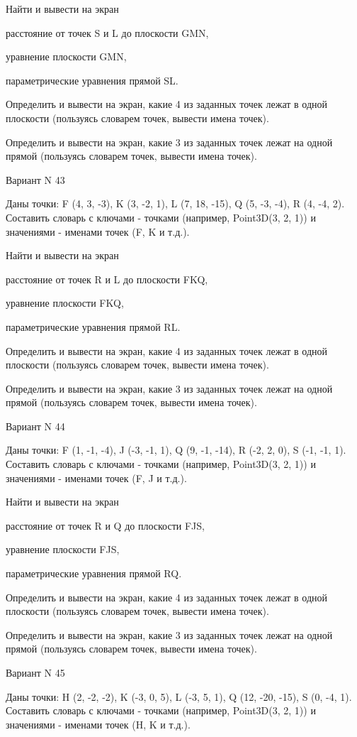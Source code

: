 \documentclass[11pt]{report}
\begin{document}
Найти и вывести на экран


расстояние от точек S и L до плоскости GMN,


уравнение плоскости GMN,


параметрические уравнения прямой SL.


Определить и вывести на экран, какие 4 из заданных точек лежат в одной плоскости (пользуясь словарем точек, вывести имена точек).


Определить и вывести на экран, какие 3 из заданных точек лежат на одной прямой (пользуясь словарем точек, вывести имена точек).

\newpage
Вариант N 43

Даны точки: F (4, 3, -3), K (3, -2, 1), L (7, 18, -15), Q (5, -3, -4), R (4, -4, 2).
Составить словарь с ключами - точками (например, Point3D(3, 2, 1)) и значениями - именами точек (F, K и т.д.).


Найти и вывести на экран


расстояние от точек R и L до плоскости FKQ,


уравнение плоскости FKQ,


параметрические уравнения прямой RL.


Определить и вывести на экран, какие 4 из заданных точек лежат в одной плоскости (пользуясь словарем точек, вывести имена точек).


Определить и вывести на экран, какие 3 из заданных точек лежат на одной прямой (пользуясь словарем точек, вывести имена точек).

\newpage
Вариант N 44

Даны точки: F (1, -1, -4), J (-3, -1, 1), Q (9, -1, -14), R (-2, 2, 0), S (-1, -1, 1).
Составить словарь с ключами - точками (например, Point3D(3, 2, 1)) и значениями - именами точек (F, J и т.д.).


Найти и вывести на экран


расстояние от точек R и Q до плоскости FJS,


уравнение плоскости FJS,


параметрические уравнения прямой RQ.


Определить и вывести на экран, какие 4 из заданных точек лежат в одной плоскости (пользуясь словарем точек, вывести имена точек).


Определить и вывести на экран, какие 3 из заданных точек лежат на одной прямой (пользуясь словарем точек, вывести имена точек).

\newpage
Вариант N 45

Даны точки: H (2, -2, -2), K (-3, 0, 5), L (-3, 5, 1), Q (12, -20, -15), S (0, -4, 1).
Составить словарь с ключами - точками (например, Point3D(3, 2, 1)) и значениями - именами точек (H, K и т.д.).
\end{document}
